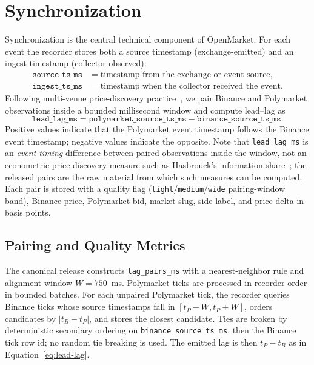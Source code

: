
\section{Synchronization}
\label{sec:synchronization}

Synchronization is the central technical component of OpenMarket.
For each event the recorder stores both a source timestamp (exchange-emitted)
and an ingest timestamp (collector-observed):
\begin{align}
  \texttt{source\_ts\_ms} &= \text{timestamp from the exchange or event source}, \\
  \texttt{ingest\_ts\_ms}  &= \text{timestamp when the collector received the event}.
\end{align}
Following multi-venue price-discovery practice~\cite{hasbrouck1995one},
we pair Binance and Polymarket observations inside a bounded millisecond
window and compute lead--lag as
\begin{equation}
  \texttt{lead\_lag\_ms}
    = \texttt{polymarket\_source\_ts\_ms} - \texttt{binance\_source\_ts\_ms}.
  \label{eq:lead-lag}
\end{equation}
Positive values indicate that the Polymarket event timestamp follows the
Binance event timestamp; negative values indicate the opposite.
Note that \texttt{lead\_lag\_ms} is an \emph{event-timing} difference between
paired observations inside the window, not an econometric price-discovery
measure such as Hasbrouck's information share~\cite{hasbrouck1995one}; the
released pairs are the raw material from which such measures can be computed.
Each pair is stored with a quality flag (\texttt{tight}/\texttt{medium}/\texttt{wide}
pairing-window band), Binance price, Polymarket bid,
market slug, side label, and price delta in basis points.

\subsection{Pairing and Quality Metrics}

The canonical release constructs \texttt{lag\_pairs\_ms} with a
nearest-neighbor rule and alignment window $W=750$~ms. Polymarket ticks are
processed in recorder order in bounded batches. For each unpaired Polymarket
tick, the recorder queries Binance ticks whose source timestamps fall in
$[t_P-W,t_P+W]$, orders candidates by $|t_B-t_P|$, and stores the closest
candidate. Ties are broken by deterministic secondary ordering on
\texttt{binance\_source\_ts\_ms}, then the Binance tick row id; no random tie
breaking is used. The emitted lag is then $t_P-t_B$ as in
Equation~\eqref{eq:lead-lag}.

